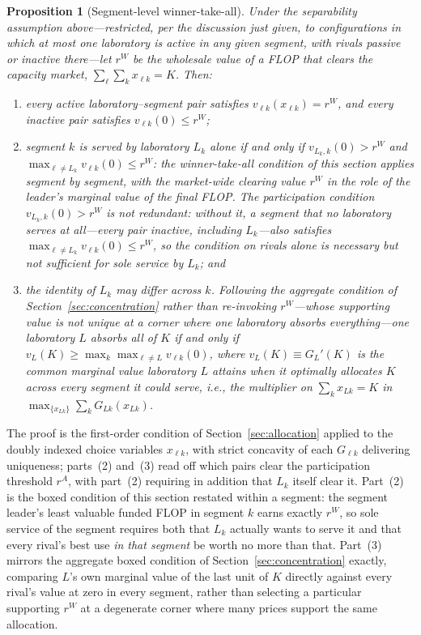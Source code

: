 \documentclass[11pt]{article}
\newtheorem{proposition}{Proposition}
\begin{document}
\begin{proposition}[Segment-level winner-take-all]
\label{prop:segment-wta}
Under the separability assumption above---restricted, per the discussion just given, to configurations in which at most one laboratory is active in any given segment, with rivals passive or inactive there---let $r^W$ be the wholesale value of a FLOP that clears the capacity market, $\sum_\ell\sum_k x_{\ell k}=K$. Then:
\begin{enumerate}
\item every active laboratory--segment pair satisfies $v_{\ell k}(x_{\ell k})=r^W$, and every inactive pair satisfies $v_{\ell k}(0)\leq r^W$;
\item segment $k$ is served by laboratory $L_k$ alone if and only if $v_{L_k,k}(0)>r^W$ \emph{and} $\max_{\ell\neq L_k}v_{\ell k}(0)\leq r^W$: the winner-take-all condition of this section applies segment by segment, with the market-wide clearing value $r^W$ in the role of the leader's marginal value of the final FLOP. The participation condition $v_{L_k,k}(0)>r^W$ is not redundant: without it, a segment that no laboratory serves at all---every pair inactive, including $L_k$---also satisfies $\max_{\ell\neq L_k}v_{\ell k}(0)\leq r^W$, so the condition on rivals alone is necessary but not sufficient for sole service by $L_k$; and
\item the identity of $L_k$ may differ across $k$. Following the aggregate condition of Section~\ref{sec:concentration} rather than re-invoking $r^W$---whose supporting value is not unique at a corner where one laboratory absorbs everything---one laboratory $L$ absorbs all of $K$ if and only if $v_L(K)\geq\max_k\max_{\ell\neq L}v_{\ell k}(0)$, where $v_L(K)\equiv G_L'(K)$ is the common marginal value laboratory $L$ attains when it optimally allocates $K$ across every segment it could serve, i.e., the multiplier on $\sum_k x_{Lk}=K$ in $\max_{\{x_{Lk}\}}\sum_k G_{Lk}(x_{Lk})$.
\end{enumerate}
\end{proposition}

The proof is the first-order condition of Section~\ref{sec:allocation} applied to the doubly indexed choice variables $x_{\ell k}$, with strict concavity of each $G_{\ell k}$ delivering uniqueness; parts~(2) and~(3) read off which pairs clear the participation threshold $r^A$, with part~(2) requiring in addition that $L_k$ itself clear it. Part~(2) is the boxed condition of this section restated within a segment: the segment leader's least valuable funded FLOP in segment $k$ earns exactly $r^W$, so sole service of the segment requires both that $L_k$ actually wants to serve it and that every rival's best use \emph{in that segment} be worth no more than that. Part~(3) mirrors the aggregate boxed condition of Section~\ref{sec:concentration} exactly, comparing $L$'s own marginal value of the last unit of $K$ directly against every rival's value at zero in every segment, rather than selecting a particular supporting $r^W$ at a degenerate corner where many prices support the same allocation.
\end{document}
